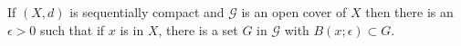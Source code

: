If $(X, d)$ is sequentially compact and $\mathcal{G}$ is an open cover of $X$ then there is an $\epsilon > 0$ such that if $x$ is in $X$, there is a set $G$ in $\mathcal{G}$ with $B(x; \epsilon) \subset G$.
